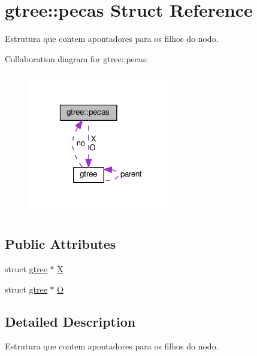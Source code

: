 \hypertarget{structgtree_1_1pecas}{\section{gtree\+:\+:pecas Struct Reference}
\label{structgtree_1_1pecas}
}


Estrutura que contem apontadores para os filhos do nodo.  




Collaboration diagram for gtree\+:\+:pecas\+:
\nopagebreak
\begin{figure}[H]
\begin{center}
\leavevmode
\includegraphics[width=183pt]{structgtree_1_1pecas__coll__graph}
\end{center}
\end{figure}
\subsection*{Public Attributes}
\begin{DoxyCompactItemize}
\item 
struct \hyperlink{structgtree}{gtree} $\ast$ \hyperlink{structgtree_1_1pecas_a91807e036e47beeb03a1868267d9ae58}{X}
\item 
struct \hyperlink{structgtree}{gtree} $\ast$ \hyperlink{structgtree_1_1pecas_a7ca95b444632a7083c1a4ff3a79662a2}{O}
\end{DoxyCompactItemize}


\subsection{Detailed Description}
Estrutura que contem apontadores para os filhos do nodo. 

